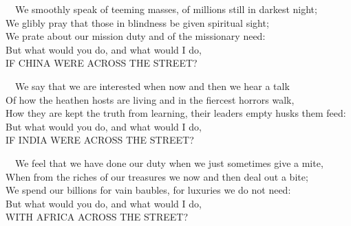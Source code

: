 \documentclass[
]{book}
\begin{document}
~~We smoothly speak of teeming masses, of millions still in darkest night;\\
\hspace*{0.333em}\hspace*{0.333em}We glibly pray that those in blindness be given spiritual sight;\\
\hspace*{0.333em}\hspace*{0.333em}We prate about our mission duty and of the missionary need:\\
\hspace*{0.333em}\hspace*{0.333em}But what would you do, and what would I do,\\
\hspace*{0.333em}\hspace*{0.333em}IF CHINA WERE ACROSS THE STREET?

~~We say that we are interested when now and then we hear a talk\\
\hspace*{0.333em}\hspace*{0.333em}Of how the heathen hosts are living and in the fiercest horrors walk,\\
\hspace*{0.333em}\hspace*{0.333em}How they are kept the truth from learning, their leaders empty husks them feed:\\
\hspace*{0.333em}\hspace*{0.333em}But what would you do, and what would I do,\\
\hspace*{0.333em}\hspace*{0.333em}IF INDIA WERE ACROSS THE STREET?

~~We feel that we have done our duty when we just sometimes give a mite,\\
\hspace*{0.333em}\hspace*{0.333em}When from the riches of our treasures we now and then deal out a bite;\\
\hspace*{0.333em}\hspace*{0.333em}We spend our billions for vain baubles, for luxuries we do not need:\\
\hspace*{0.333em}\hspace*{0.333em}But what would you do, and what would I do,\\
\hspace*{0.333em}\hspace*{0.333em}WITH AFRICA ACROSS THE STREET?
\end{document}
